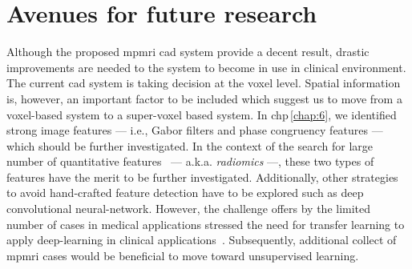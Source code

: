 \section{Avenues for future research}

Although the proposed \ac{mpmri} \ac{cad} system provide a decent result, drastic improvements are needed to the system to become in use in clinical environment.
The current \ac{cad} system is taking decision at the voxel level.
Spatial information is, however, an important factor to be included which suggest us to move from a voxel-based system to a super-voxel based system.
In \acs{chp}\,\ref{chap:6}, we identified strong image features --- i.e., Gabor filters and phase congruency features --- which should be further investigated.
In the context of the search for large number of quantitative features~\cite{lambin2012radiomics} --- a.k.a. \emph{radiomics} ---, these two types of features have the merit to be further investigated.
Additionally, other strategies to avoid hand-crafted feature detection have to be explored such as deep convolutional neural-network.
However, the challenge offers by the limited number of cases in medical applications stressed the need for transfer learning to apply deep-learning in clinical applications~\cite{shin2016deep}.
Subsequently, additional collect of \ac{mpmri} cases would be beneficial to move toward unsupervised learning.